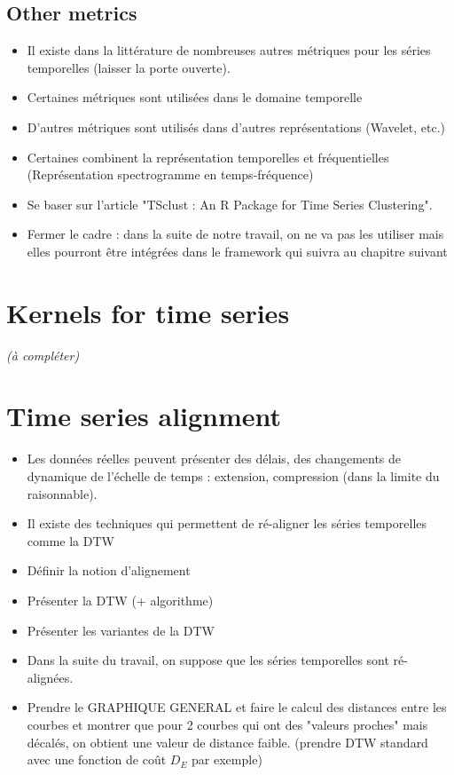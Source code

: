 \subsection{Other metrics}
\begin{itemize}
	\item Il existe dans la littérature de nombreuses autres métriques pour les séries temporelles (laisser la porte ouverte).
	\item Certaines métriques sont utilisées dans le domaine temporelle
	\item D'autres métriques sont utilisés dans d'autres représentations (Wavelet, etc.)
	\item Certaines combinent la représentation temporelles et fréquentielles (Représentation spectrogramme en temps-fréquence)
	\item Se baser sur l'article "TSclust : An R Package for Time Series Clustering".
	\item Fermer le cadre : dans la suite de notre travail, on ne va pas les utiliser mais elles pourront être intégrées dans le framework qui suivra au chapitre suivant
\end{itemize}
\section{Kernels for time series}
\textit{(à compléter)}

\section{Time series alignment}
\begin{itemize}
	\item Les données réelles peuvent présenter des délais, des changements de dynamique de l'échelle de temps : extension, compression (dans la limite du raisonnable).
	\item Il existe des techniques qui permettent de ré-aligner les séries temporelles comme la DTW
	\item Définir la notion d'alignement
	\item Présenter la DTW (+ algorithme)
	\item Présenter les variantes de la DTW
	\item Dans la suite du travail, on suppose que les séries temporelles sont ré-alignées.
	\item Prendre le GRAPHIQUE GENERAL et faire le calcul des distances entre les courbes et montrer que pour 2 courbes qui ont des "valeurs proches" mais décalés, on obtient une valeur de distance faible. (prendre DTW standard avec une fonction de coût $D_E$ par exemple)
\end{itemize}


